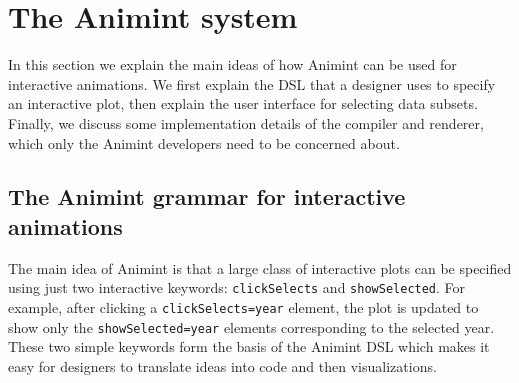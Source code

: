 \documentclass[10pt,journal,compsoc]{IEEEtran}\usepackage[]{graphicx}\usepackage[]{color}
\begin{document}


\section{The Animint system}
\label{sec:design}

In this section we explain the main ideas of how Animint can be used
for interactive animations. We first explain the DSL that a designer
uses to specify an interactive plot, then explain the user interface
for selecting data subsets. Finally, we discuss some implementation
details of the compiler and renderer, which only the Animint
developers need to be concerned about.

\subsection{The Animint grammar for interactive animations}



The main idea of Animint is that a large class of interactive plots
can be specified using just two interactive keywords:
\texttt{clickSelects} and \texttt{showSelected}. For example, after
clicking a \texttt{clickSelects=year} element, the plot
is updated to show only the \texttt{showSelected=year} elements
corresponding to the selected year. These two simple keywords
form the basis of the Animint DSL which makes it easy for designers
to translate ideas into code and then visualizations.
\end{document}

